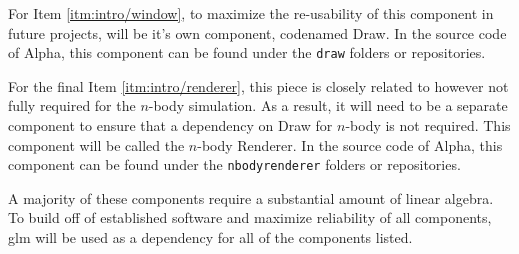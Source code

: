 For Item \ref{itm:intro/window}, to maximize the re-usability of this component
in future projects, will be it's own component, codenamed Draw. In the source
code of Alpha, this component can be found under the \texttt{draw} folders or
repositories.

For the final Item \ref{itm:intro/renderer}, this piece is closely related to
however not fully required for the $n$-body simulation. As a result, it will
need to be a separate component to ensure that a dependency on Draw for $n$-body
is not required. This component will be called the $n$-body Renderer. In the
source code of Alpha, this component can be found under the
\texttt{nbodyrenderer} folders or repositories.

A majority of these components require a substantial amount of linear algebra.
To build off of established software and maximize reliability of all components,
glm will be used as a dependency for all of the components listed.

